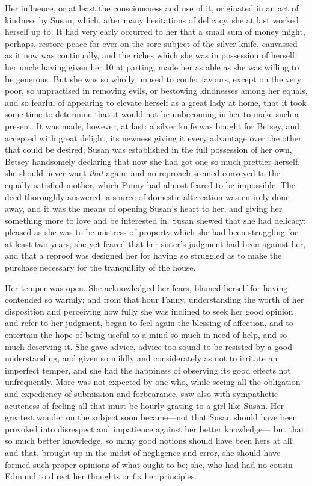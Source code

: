 \documentclass{article}
\begin{document}
Her influence, or at least the consciousness and use of it,
originated in an act of kindness by Susan, which, after many
hesitations of delicacy, she at last worked herself up to.
It had very early occurred to her that a small sum
of money might, perhaps, restore peace for ever on the
sore subject of the silver knife, canvassed as it now
was continually, and the riches which she was in possession
of herself, her uncle having given her 10 at parting,
made her as able as she was willing to be generous.
But she was so wholly unused to confer favours,
except on the very poor, so unpractised in removing evils,
or bestowing kindnesses among her equals, and so fearful
of appearing to elevate herself as a great lady at home,
that it took some time to determine that it would not be
unbecoming in her to make such a present.  It was made,
however, at last:  a silver knife was bought for Betsey,
and accepted with great delight, its newness giving it
every advantage over the other that could be desired;
Susan was established in the full possession of her own,
Betsey handsomely declaring that now she had got one so much
prettier herself, she should never want \emph{that} again; and no
reproach seemed conveyed to the equally satisfied mother,
which Fanny had almost feared to be impossible.  The deed
thoroughly answered:  a source of domestic altercation
was entirely done away, and it was the means of opening
Susan's heart to her, and giving her something more to love
and be interested in.  Susan shewed that she had delicacy:
pleased as she was to be mistress of property which she
had been struggling for at least two years, she yet
feared that her sister's judgment had been against her,
and that a reproof was designed her for having so struggled
as to make the purchase necessary for the tranquillity of
the house.

Her temper was open.  She acknowledged her fears,
blamed herself for having contended so warmly;
and from that hour Fanny, understanding the worth of her
disposition and perceiving how fully she was inclined
to seek her good opinion and refer to her judgment,
began to feel again the blessing of affection, and to
entertain the hope of being useful to a mind so much in
need of help, and so much deserving it.  She gave advice,
advice too sound to be resisted by a good understanding,
and given so mildly and considerately as not to irritate
an imperfect temper, and she had the happiness of observing
its good effects not unfrequently.  More was not expected
by one who, while seeing all the obligation and expediency
of submission and forbearance, saw also with sympathetic
acuteness of feeling all that must be hourly grating
to a girl like Susan.  Her greatest wonder on the subject
soon became---not that Susan should have been provoked into
disrespect and impatience against her better knowledge---%
but that so much better knowledge, so many good notions
should have been hers at all; and that, brought up in the
midst of negligence and error, she should have formed
such proper opinions of what ought to be; she, who had
had no cousin Edmund to direct her thoughts or fix her principles.
\end{document}
